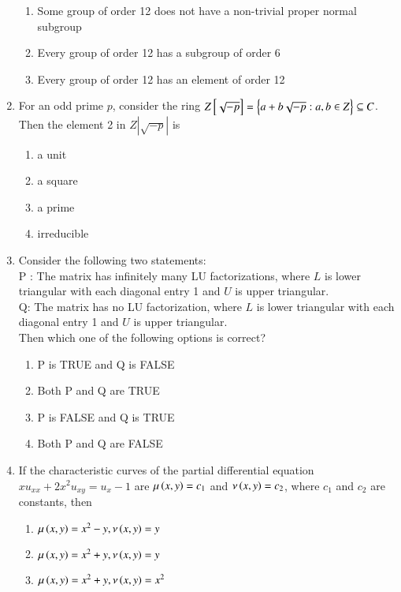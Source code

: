 \documentclass[journal]{IEEEtran}
\begin{document}
\begin{enumerate}
\begin{enumerate}
    \item Some group of order 12 does not have a non-trivial proper normal subgroup
    \item Every group of order 12 has a subgroup of order 6
    \item Every group of order 12 has an element of order 12
\end{enumerate}
\item For an odd prime $p$, consider the ring $Z{}\left[\sqrt{-p}\right]=\left\{a+b\sqrt{-p}: a,b\in Z\right\}\subseteq C$. Then the element 2 in $Z|\sqrt{-p}|$ is 
\begin{multicols}{4}
\begin{enumerate}
    \item a unit 
    \item a square
    \item a prime 
    \item irreducible
\end{enumerate}
\end{multicols}
\item Consider the following two statements:\\
  P : The matrix  has infinitely many LU factorizations, where $L$ is lower triangular with each diagonal entry 1 and $U$ is upper triangular.\\
  Q: The matrix  has no LU factorization, where $L$ is lower triangular with each diagonal entry 1 and $U$ is upper triangular.\\
  Then which one of the following options is correct?
  \begin{enumerate}
      \item P is TRUE and Q is FALSE
      \item Both P and Q are TRUE
      \item P is FALSE and Q is TRUE
      \item Both P and Q are FALSE
  \end{enumerate}
\item If the characteristic curves of the partial differential equation $xu_{xx}+2x^2u_{xy}=u_x-1$ are $\mu\left(x,y\right)=c_1$ and $\nu\left(x,y\right)=c_2$, where $c_1$ and $c_2$ are constants, then
\begin{enumerate}
    \item $\mu\left(x,y\right)=x^2-y,\nu\left(x,y\right)=y$
    \item $\mu\left(x,y\right)=x^2+y,\nu\left(x,y\right)=y$
    \item $\mu\left(x,y\right)=x^2+y,\nu\left(x,y\right)=x^2$

\end{enumerate}
\end{enumerate}
\end{document}
